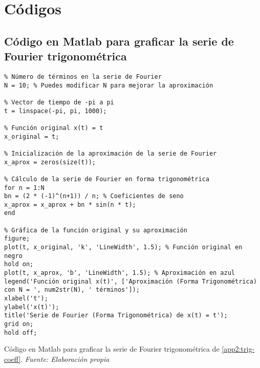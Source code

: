 \chapter{Códigos}\label{app3:Estado-del-arte-codes}

\section{Código en Matlab para graficar la serie de Fourier trigonométrica}\label{app3:trig-code-matlab}
\begin{longlisting}
	\begin{verbatim}
% Número de términos en la serie de Fourier
N = 10; % Puedes modificar N para mejorar la aproximación
		
% Vector de tiempo de -pi a pi
t = linspace(-pi, pi, 1000);
		
% Función original x(t) = t
x_original = t;
		
% Inicialización de la aproximación de la serie de Fourier
x_aprox = zeros(size(t));
		
% Cálculo de la serie de Fourier en forma trigonométrica
for n = 1:N
bn = (2 * (-1)^(n+1)) / n; % Coeficientes de seno
x_aprox = x_aprox + bn * sin(n * t);
end

% Gráfica de la función original y su aproximación
figure;
plot(t, x_original, 'k', 'LineWidth', 1.5); % Función original en negro
hold on;
plot(t, x_aprox, 'b', 'LineWidth', 1.5); % Aproximación en azul
legend('Función original x(t)', ['Aproximación (Forma Trigonométrica) con N = ', num2str(N), ' términos']);
xlabel('t');
ylabel('x(t)');
title('Serie de Fourier (Forma Trigonométrica) de x(t) = t');
grid on;
hold off;		
	\end{verbatim}
		\caption[Código en Matlab para graficar la serie de Fourier trigonométrica de \ref{app2:trig-coeff}.] {Código en Matlab para graficar la serie de Fourier trigonométrica de \ref{app2:trig-coeff}. \textit{Fuente: Elaboración propia}} 

\end{longlisting}


